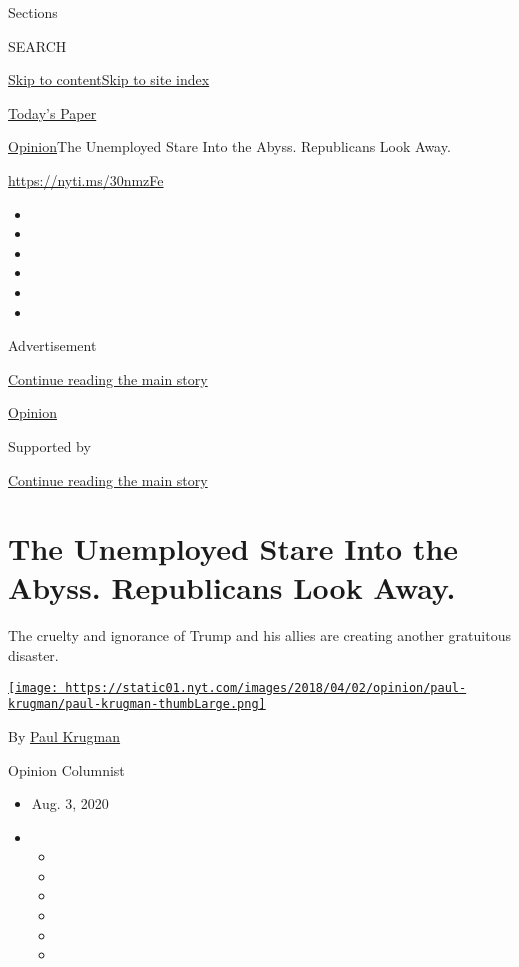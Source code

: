 Sections

SEARCH

\protect\hyperlink{site-content}{Skip to
content}\protect\hyperlink{site-index}{Skip to site index}

\href{https://myaccount.nytimes.com/auth/login?response_type=cookie\&client_id=vi}{}

\href{https://www.nytimes.com/section/todayspaper}{Today's Paper}

\href{/section/opinion}{Opinion}\textbar{}The Unemployed Stare Into the
Abyss. Republicans Look Away.

\url{https://nyti.ms/30nmzFe}

\begin{itemize}
\item
\item
\item
\item
\item
\item
\end{itemize}

Advertisement

\protect\hyperlink{after-top}{Continue reading the main story}

\href{/section/opinion}{Opinion}

Supported by

\protect\hyperlink{after-sponsor}{Continue reading the main story}

\hypertarget{the-unemployed-stare-into-the-abyss-republicans-look-away}{%
\section{The Unemployed Stare Into the Abyss. Republicans Look
Away.}\label{the-unemployed-stare-into-the-abyss-republicans-look-away}}

The cruelty and ignorance of Trump and his allies are creating another
gratuitous disaster.

\href{https://www.nytimes.com/by/paul-krugman}{\texttt{[image: https://static01.nyt.com/images/2018/04/02/opinion/paul-krugman/paul-krugman-thumbLarge.png]}}

By \href{https://www.nytimes.com/by/paul-krugman}{Paul Krugman}

Opinion Columnist

\begin{itemize}
\item
  Aug. 3, 2020
\item
  \begin{itemize}
  \item
  \item
  \item
  \item
  \item
  \item
  \end{itemize}
\end{itemize}

